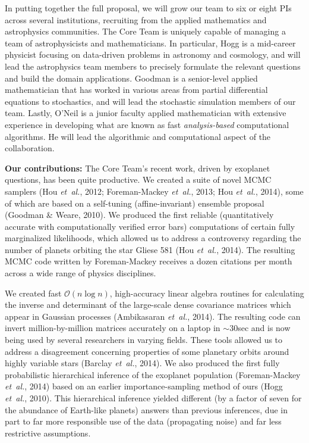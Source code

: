 \documentclass[11pt]{article}
\newcommand{\foreign}[1]{\textsl{#1}}
\newcommand{\etal}{\foreign{et~al.}}
\renewcommand{\paragraph}[1]{\smallskip\par\noindent\textbf{{#1}:}}
\begin{document}
In putting together the full proposal, we will grow our team to six or
eight PIs across several institutions, recruiting from the applied
mathematics and astrophysics communities.
The Core Team is uniquely capable of managing a team of astrophysicists
and mathematicians.
In particular, Hogg is a mid-career physicist
focusing on data-driven problems in astronomy and cosmology, and will
lead the astrophysics team members to precisely formulate the relevant 
questions and build the domain applications.
Goodman is a senior-level applied mathematician that has worked in
various areas from partial differential equations to stochastics,
and will lead the stochastic simulation members of our team.
Lastly, O'Neil is a junior faculty applied mathematician with extensive
experience in developing what are known as fast {\em analysis-based}
computational algorithms.
He will lead the algorithmic and computational aspect of the
collaboration.

\paragraph{Our contributions}
The Core Team's recent work, driven by exoplanet questions,
has been quite productive.
We created a suite of novel MCMC samplers 
(Hou \etal, 2012; Foreman-Mackey \etal, 2013; Hou \etal,
2014), some of which are based on a self-tuning (affine-invariant)
ensemble proposal (Goodman \& Weare, 2010).
We produced the first reliable (quantitatively accurate with
computationally verified error bars) computations of certain fully
marginalized likelihoods, which allowed us to address a controversy
regarding the number of planets orbiting the star Gliese 581 (Hou \etal,
2014).
The resulting MCMC code written by Foreman-Mackey receives a dozen
citations per month across a wide range of physics disciplines.

We created fast $\mathcal O(n \log n)$, high-accuracy linear algebra
routines for calculating the inverse and determinant of the large-scale
dense covariance matrices which appear in Gaussian processes
(Ambikasaran \etal, 2014).
The resulting code can invert million-by-million matrices
accurately on a laptop in $\sim 30$sec and is now being used by
several researchers in varying fields.
These tools allowed us to address a disagreement concerning properties
of some planetary orbits around highly variable stars (Barclay \etal,
2014).
We also produced the first fully probabilistic hierarchical inference of
the exoplanet population (Foreman-Mackey \etal, 2014) based on an
earlier importance-sampling method of ours (Hogg \etal, 2010).
This hierarchical inference yielded different (by a factor of seven for
the abundance of Earth-like planets) answers than previous inferences,
due in part to far more responsible use of the data (propagating noise)
and far less restrictive assumptions.
\end{document}
